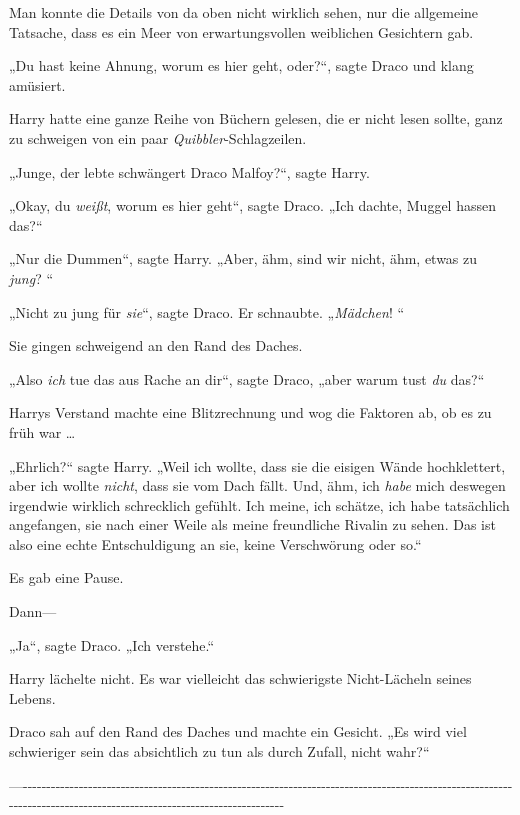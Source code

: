 {Man konnte die Details von da oben nicht wirklich sehen, nur die allgemeine Tatsache, dass es ein Meer von erwartungsvollen weiblichen Gesichtern gab.

„Du hast keine Ahnung, worum es hier geht, oder?“, sagte Draco und klang amüsiert.

Harry hatte eine ganze Reihe von Büchern gelesen, die er nicht lesen sollte, ganz zu schweigen von ein paar \emph{Quibbler}-Schlagzeilen.

„Junge, der lebte schwängert Draco Malfoy?“, sagte Harry.

„Okay, du \emph{weißt}, worum es hier geht“, sagte Draco. „Ich dachte, Muggel hassen das?“

„Nur die Dummen“, sagte Harry. „Aber, ähm, sind wir nicht, ähm, etwas zu \emph{jung}? “

„Nicht zu jung für \emph{sie}“, sagte Draco. Er schnaubte. „\emph{Mädchen}! “

Sie gingen schweigend an den Rand des Daches.

„Also \emph{ich} tue das aus Rache an dir“, sagte Draco, „aber warum tust \emph{du} das?“

Harrys Verstand machte eine Blitzrechnung und wog die Faktoren ab, ob es zu früh war …

„Ehrlich?“ sagte Harry. „Weil ich wollte, dass sie die eisigen Wände hochklettert, aber ich wollte \emph{nicht}, dass sie vom Dach fällt. Und, ähm, ich \emph{habe} mich deswegen irgendwie wirklich schrecklich gefühlt. Ich meine, ich schätze, ich habe tatsächlich angefangen, sie nach einer Weile als meine freundliche Rivalin zu sehen. Das ist also eine echte Entschuldigung an sie, keine Verschwörung oder so.“

Es gab eine Pause.

Dann—

„Ja“, sagte Draco. „Ich verstehe.“

Harry lächelte nicht. Es war vielleicht das schwierigste Nicht-Lächeln seines Lebens.

Draco sah auf den Rand des Daches und machte ein Gesicht. „Es wird viel schwieriger sein das absichtlich zu tun als durch Zufall, nicht wahr?“

—\/-\/-\/-\/-\/-\/-\/-\/-\/-\/-\/-\/-\/-\/-\/-\/-\/-\/-\/-\/-\/-\/-\/-\/-\/-\/-\/-\/-\/-\/-\/-\/-\/-\/-\/-\/-\/-\/-\/-\/-\/-\/-\/-\/-\/-\/-\/-\/-\/-\/-\/-\/-\/-\/-\/-\/-\/-\/-\/-\/-\/-\/-\/-\/-\/-\/-\/-\/-\/-\/-\/-\/-\/-\/-\/-\/-\/-\/-\/-\/-\/-\/-\/-\/-\/-\/-\/-\/-\/-\/-\/-\/-\/-\/-\/-\/-\/-\/-\/-\/-\/-\/-\/-\/-\/-\/-\/-\/-\/-\/-\/-\/-\/-\/-\/-\/-\/-\/-\/-\/-\/-\/-\/-\/-\/-\/-\/-\/-\/-\/-\/-\/-\/-\/-\/-\/-\/-\/-\/-\/-\/-\/-\/-\/-\/-\/-\/-\/-\/-\/-\/-\/-\/-\/-\/-\/-\/-\/-\/-\/-\/-\/-\/-\/-

}
